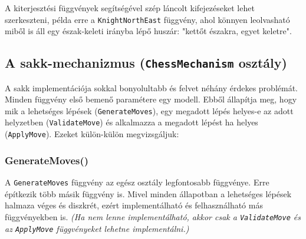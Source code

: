 \documentclass[twoside, a4paper, 12pt]{book}
\begin{document}
A kiterjesztési függvények segítségével szép láncolt kifejezéseket lehet szerkeszteni, példa erre a \texttt{KnightNorthEast} függvény, ahol könnyen leolvasható miből is áll egy észak-keleti irányba lépő huszár: "kettőt északra, egyet keletre".

\subsection{A sakk-mechanizmus (\texttt{ChessMechanism} osztály)}

A sakk implementációja sokkal bonyolultabb és felvet néhány érdekes problémát. Minden függvény első bemenő paramétere egy modell. Ebből állapítja meg, hogy mik a lehetséges lépések (\texttt{GenerateMoves}), egy megadott lépés helyes-e az adott helyzetben (\texttt{ValidateMove}) és alkalmazza a megadott lépést ha helyes (\texttt{ApplyMove}). Ezeket külön-külön megvizsgáljuk:

\subsubsection{GenerateMoves()}
A \texttt{GenerateMoves} függvény az egész osztály legfontosabb függvénye. Erre építkezik több másik függvény is. Mivel minden állapotban a lehetséges lépések halmaza véges és diszkrét, ezért implementálható és felhasználható más függvényekben is. \textit{(Ha nem lenne implementálható, akkor csak a \texttt{ValidateMove} és az \texttt{ApplyMove} függvényeket lehetne implementálni.)}
\end{document}
